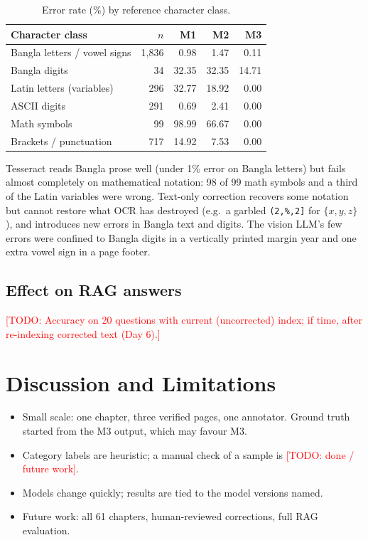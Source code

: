 \documentclass[11pt]{article}
\newcommand{\todo}[1]{\textcolor{red}{[TODO: #1]}}
\begin{document}
\begin{table}[h]
\centering
\begin{tabular}{lrrrr}
\toprule
Character class & $n$ & M1 & M2 & M3 \\
\midrule
Bangla letters / vowel signs & 1{,}836 & 0.98 & 1.47 & 0.11 \\
Bangla digits & 34 & 32.35 & 32.35 & 14.71 \\
Latin letters (variables) & 296 & 32.77 & 18.92 & 0.00 \\
ASCII digits & 291 & 0.69 & 2.41 & 0.00 \\
Math symbols & 99 & 98.99 & 66.67 & 0.00 \\
Brackets / punctuation & 717 & 14.92 & 7.53 & 0.00 \\
\bottomrule
\end{tabular}
\caption{Error rate (\%) by reference character class.}
\label{tab:class}
\end{table}

Tesseract reads Bangla prose well (under 1\% error on Bangla letters) but
fails almost completely on mathematical notation: 98 of 99 math symbols and a
third of the Latin variables were wrong. Text-only correction recovers some
notation but cannot restore what OCR has destroyed (e.g.\ a garbled
\texttt{(2,\%,2]} for $\{x,y,z\}$), and introduces new errors in Bangla text
and digits. The vision LLM's few errors were confined to Bangla digits in a
vertically printed margin year and one extra vowel sign in a page footer.

\subsection{Effect on RAG answers}
\todo{Accuracy on 20 questions with current (uncorrected) index; if time,
after re-indexing corrected text (Day 6).}

\section{Discussion and Limitations}
\begin{itemize}
  \item Small scale: one chapter, three verified pages, one annotator.
        Ground truth started from the M3 output, which may favour M3.\label{sec:limits}
  \item Category labels are heuristic; a manual check of a sample is
        \todo{done / future work}.
  \item Models change quickly; results are tied to the model versions named.
  \item Future work: all 61 chapters, human-reviewed corrections, full RAG
        evaluation.
\end{itemize}
\end{document}
